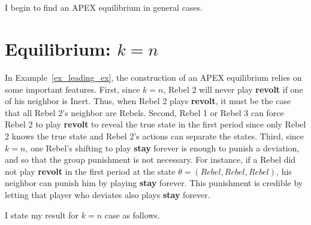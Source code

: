 \documentclass[12pt,letter]{article}
\theoremstyle{definition}
\theoremstyle{remark}
\theoremstyle{claim}
\begin{document}
\subsection*{}
I begin to find an APEX equilibrium in general cases.

\section{Equilibrium: $k=n$}
\label{sec:equilibrium_1}


In Example~\ref{ex_leading_ex}, the construction of an APEX equilibrium relies on some important features. First, since $k=n$, Rebel 2 will never play \textbf{revolt} if one of his neighbor is Inert. Thus, when Rebel 2 plays \textbf{revolt}, it must be the case that all Rebel 2's neighbor are Rebels.  Second, Rebel 1 or Rebel 3 can force Rebel 2 to play \textbf{revolt} to reveal the true state in the first period since only Rebel 2 knows the true state and Rebel 2's actions can separate the states. Third, since $k=n$, one Rebel's shifting to play \textbf{stay} forever is enough to punish a deviation, and so that the group punishment is not necessary. For instance, if a Rebel did not play \textbf{revolt} in the first period at the state $\theta=(Rebel,Rebel,Rebel)$, his neighbor can punish him by playing \textbf{stay} forever. This punishment is credible by letting that player who deviates also plays \textbf{stay} forever. 

I state my result for $k=n$ case as follows.
\end{document}
